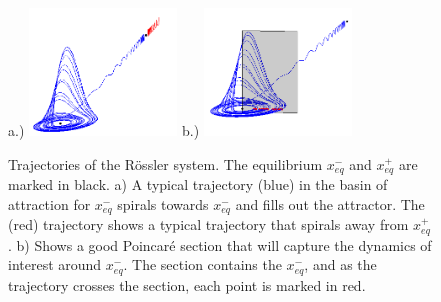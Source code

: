 \documentclass[12 pt]{article}
\begin{document}
 \begin{figure}[h]
\centering
a.)  \includegraphics[width=0.35\textwidth]{Figs/Section1/kcRosslerTrajc.png}
b.)
  \includegraphics[width=0.35\textwidth]{Figs/Section1/kcRosslerTrajwithPSc.png}
\caption{Trajectories of the R\"ossler system.  The equilibrium
$x_{eq}^{-}$ and $x_{eq}^{+}$ are marked in black.  a) A typical
trajectory (blue) in the basin of attraction for $x_{eq}^{-}$ spirals
towards $x_{eq}^{-}$ and fills out the attractor.  The (red) trajectory
shows a typical trajectory that spirals away from $x_{eq}^{+}$.  b) Shows
a good Poincar\'e section that will capture the dynamics of interest
around $x_{eq}^{-}$.  The section contains the $x_{eq}^{-}$, and as the
trajectory crosses the section, each point is marked in red.}
 \label{fig:RossTraj}
\end{figure}
\end{document}
